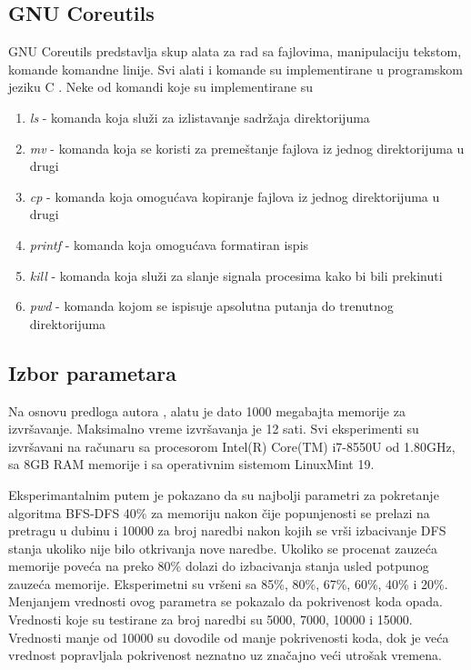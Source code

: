 \documentclass[12pt,oneside]{memoir}
\begin{document}
\subsection{GNU Coreutils}
GNU Coreutils predstavlja skup alata za rad sa fajlovima, manipulaciju tekstom, komande komandne linije. Svi alati i komande su implementirane u programskom jeziku C \cite{coreutils}. Neke od komandi koje su implementirane su 

\begin{enumerate}
    \item \textit{ls} - komanda koja služi za izlistavanje sadržaja direktorijuma
    
    \item \textit{mv} - komanda koja se koristi za premeštanje fajlova iz jednog direktorijuma u drugi
    
    \item \textit{cp} - komanda koja omogućava kopiranje fajlova iz jednog direktorijuma u drugi
    
    \item \textit{printf} - komanda koja omogućava formatiran ispis
    
    \item \textit{kill} - komanda koja služi za slanje signala procesima kako bi bili prekinuti
    
    \item \textit{pwd} - komanda kojom se ispisuje apsolutna putanja do trenutnog direktorijuma
\end{enumerate} 

\subsection{Izbor parametara}
Na osnovu predloga autora \cite{klee}, alatu je dato 1000 megabajta memorije za izvršavanje. Maksimalno vreme izvršavanja je 12 sati. Svi eksperimenti su izvršavani na računaru sa procesorom Intel(R) Core(TM) i7-8550U od 1.80GHz, sa 8GB RAM memorije i sa operativnim sistemom LinuxMint 19.

Eksperimantalnim putem je pokazano da su najbolji parametri za pokretanje algoritma BFS-DFS 40\% za memoriju nakon čije popunjenosti se prelazi na pretragu u dubinu i 10000 za broj naredbi nakon kojih se vrši izbacivanje DFS stanja ukoliko nije bilo otkrivanja nove naredbe. Ukoliko se procenat zauzeća memorije poveća na preko 80\% dolazi do izbacivanja stanja usled potpunog zauzeća memorije. Eksperimetni su vršeni sa 85\%, 80\%, 67\%, 60\%, 40\% i 20\%. Menjanjem vrednosti ovog parametra se pokazalo da pokrivenost koda opada. Vrednosti koje su testirane za broj naredbi su 5000, 7000, 10000 i 15000. Vrednosti manje od 10000 su dovodile od manje pokrivenosti koda, dok je veća vrednost popravljala pokrivenost neznatno uz značajno veći utrošak vremena.
\end{document}
